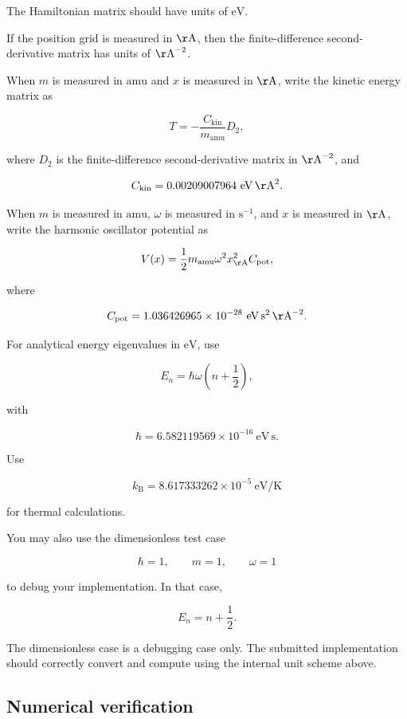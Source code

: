 The Hamiltonian matrix should have units of \(\mathrm{eV}\).

If the position grid is measured in \(\mathrm{\AA}\), then the finite-difference second-derivative matrix has units of \(\mathrm{\AA}^{-2}\).


When \(m\) is measured in \(\mathrm{amu}\) and \(x\) is measured in \(\mathrm{\AA}\), write the kinetic energy matrix as

\[
T
=
-
\frac{C_{\mathrm{kin}}}{m_{\mathrm{amu}}}
D_2,
\]

where \(D_2\) is the finite-difference second-derivative matrix in \(\mathrm{\AA}^{-2}\), and

\[
C_{\mathrm{kin}}
=
0.00209007964\ \mathrm{eV}\,\mathrm{\AA}^2.
\]

When \(m\) is measured in \(\mathrm{amu}\), \(\omega\) is measured in \(\mathrm{s}^{-1}\), and \(x\) is measured in \(\mathrm{\AA}\), write the harmonic oscillator potential as

\[
V(x)
=
\frac{1}{2}
m_{\mathrm{amu}}
\omega^2
x_{\mathrm{\AA}}^2
C_{\mathrm{pot}},
\]

where

\[
C_{\mathrm{pot}}
=
1.036426965\times10^{-28}
\ \mathrm{eV}\,\mathrm{s}^2\,\mathrm{\AA}^{-2}.
\]

For analytical energy eigenvalues in \(\mathrm{eV}\), use

\[
E_n
=
\hbar\omega
\left(n+\frac{1}{2}\right),
\]

with

\[
\hbar
=
6.582119569\times10^{-16}\ \mathrm{eV}\,\mathrm{s}.
\]

Use

\[
k_{\mathrm B}
=
8.617333262\times10^{-5}\ \mathrm{eV/K}
\]

for thermal calculations.

You may also use the dimensionless test case

\[
\hbar=1,
\qquad
m=1,
\qquad
\omega=1
\]

to debug your implementation. In that case,

\[
E_n
=
n+\frac{1}{2}.
\]

The dimensionless case is a debugging case only. The submitted implementation should correctly convert and compute using the internal unit scheme above.

\subsection{Numerical verification}

